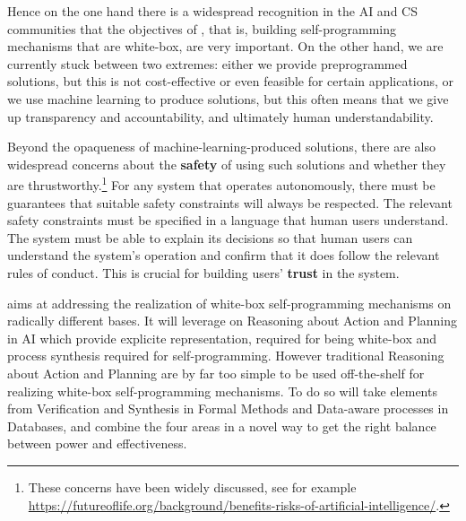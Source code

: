 Hence on the one hand
there is a widespread 
 recognition in the AI and CS communities that the objectives of
 \project, that is, building 
 self-programming mechanisms that are white-box, are very important.
 On the other hand, we are currently stuck between two extremes:
 either we provide preprogrammed solutions, but this is not
 cost-effective or even feasible for certain applications, or we use
 machine learning to produce solutions, but this often means that we
 give up transparency and accountability, and ultimately human
 understandability.


Beyond the opaqueness of machine-learning-produced solutions, there
are also widespread concerns about the \textbf{safety} of using such solutions and
whether they are thrustworthy.\footnote{These concerns have been
  widely discussed, see for example
  \url{https://futureoflife.org/background/benefits-risks-of-artificial-intelligence/}. }
For any system that operates autonomously, there must be guarantees
that suitable safety constraints will always be respected. 
The relevant safety constraints must be specified in a language that human
users understand.
The system must be able to explain its decisions so that human users
can understand the system's operation and confirm that it does follow
the relevant rules of conduct.
This is crucial for building users'  \textbf{trust} in the system.

\project aims at
addressing the realization of white-box self-programming mechanisms on radically different bases. 
It will leverage on Reasoning about Action and Planning in AI which provide explicite representation, required for being white-box and process synthesis required for self-programming. However traditional Reasoning about Action and Planning are by far too simple to be used off-the-shelf for realizing  white-box self-programming mechanisms. To do so \project will take elements from Verification and Synthesis in Formal Methods and Data-aware processes in Databases, and combine the four areas in a novel way to get the right balance between power and effectiveness.


